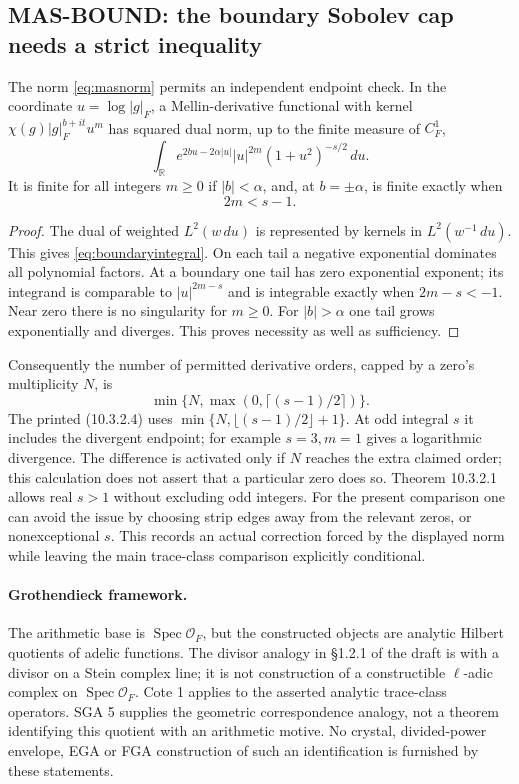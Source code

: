 \documentclass[11pt,a4paper]{article}
\newcommand{\Spec}{\operatorname{Spec}}
\newcommand{\R}{\mathbb R}
\begin{document}
\subsection{MAS-BOUND: the boundary Sobolev cap needs a strict inequality}
The norm \eqref{eq:masnorm} permits an independent endpoint check. In the coordinate $u=\log|g|_F$, a Mellin-derivative functional with kernel $\chi(g)|g|_F^{b+it}u^m$ has squared dual norm, up to the finite measure of $C_F^1$,
\begin{equation}\label{eq:boundaryintegral}
 \int_\R e^{2bu-2\alpha|u|}|u|^{2m}(1+u^2)^{-s/2}\,du.
\end{equation}
It is finite for all integers $m\ge0$ if $|b|<\alpha$, and, at $b=\pm\alpha$, is finite exactly when
\begin{equation}\label{eq:strictcap}
 2m<s-1.
\end{equation}
\begin{proof}
The dual of weighted $L^2(w\,du)$ is represented by kernels in $L^2(w^{-1}\,du)$. This gives \eqref{eq:boundaryintegral}. On each tail a negative exponential dominates all polynomial factors. At a boundary one tail has zero exponential exponent; its integrand is comparable to $|u|^{2m-s}$ and is integrable exactly when $2m-s<-1$. Near zero there is no singularity for $m\ge0$. For $|b|>\alpha$ one tail grows exponentially and diverges. This proves necessity as well as sufficiency.
\end{proof}
Consequently the number of permitted derivative orders, capped by a zero's multiplicity $N$, is
\[
 \min\{N,\max(0,\lceil(s-1)/2\rceil)\}.
\]
The printed (10.3.2.4) uses $\min\{N,\lfloor(s-1)/2\rfloor+1\}$. At odd integral $s$ it includes the divergent endpoint; for example $s=3,m=1$ gives a logarithmic divergence. The difference is activated only if $N$ reaches the extra claimed order; this calculation does not assert that a particular zero does so. Theorem 10.3.2.1 allows real $s>1$ without excluding odd integers. For the present comparison one can avoid the issue by choosing strip edges away from the relevant zeros, or nonexceptional $s$. This records an actual correction forced by the displayed norm while leaving the main trace-class comparison explicitly conditional.

\paragraph{Grothendieck framework.}
The arithmetic base is $\Spec\mathcal O_F$, but the constructed objects are analytic Hilbert quotients of adelic functions. The divisor analogy in \S1.2.1 of the draft is with a divisor on a Stein complex line; it is not construction of a constructible $\ell$-adic complex on $\Spec\mathcal O_F$. Cote 1 applies to the asserted analytic trace-class operators. SGA 5 supplies the geometric correspondence analogy, not a theorem identifying this quotient with an arithmetic motive. No crystal, divided-power envelope, EGA or FGA construction of such an identification is furnished by these statements.
\end{document}
